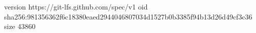 version https://git-lfs.github.com/spec/v1
oid sha256:981356362f6c18380eaed2944046807034d1527b0b3385f94b13d26d49cf3c36
size 43860
